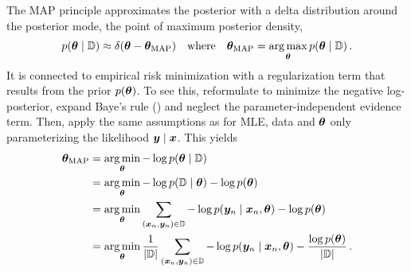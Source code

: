 The MAP principle approximates the posterior with a delta distribution around
the posterior mode, \ie the point of maximum posterior density,
\begin{align}
  \label{eq:background::MAP}
  p({\bm{\theta}}\;|\;{\mathbb{D}})
  \approx
  \delta({\bm{\theta}} - {\bm{\theta}}_{\text{MAP}})
  \quad\text{where}\quad
  {\bm{\theta}}_{\text{MAP}}
  =
  \operatorname*{arg\,max}_{{\bm{\theta}}} p({\bm{\theta}}\;|\;{\mathbb{D}})\,.
\end{align}
It is connected to empirical risk minimization with a regularization term that
results from the prior $p({\bm{\theta}})$. To see this, reformulate
 to minimize the negative log-posterior, expand Baye's
rule () and neglect the parameter-independent
evidence term. Then, apply the same assumptions as for MLE, \ie \iid data and
${\bm{\theta}}$ only parameterizing the likelihood ${\bm{y}}\;|\;{\bm{x}}$. This yields
\begin{align}
  \label{eq:background::MAPRelationToEmpiricalRiskMinimization}
  \begin{split}
    {\bm{\theta}}_{\text{MAP}}
    &= \operatorname*{arg\,min}_{{\bm{\theta}}} -\log p({\bm{\theta}}\;|\;{\mathbb{D}})
    \\
    &= \operatorname*{arg\,min}_{{\bm{\theta}}} -\log p({\mathbb{D}}\;|\;{\bm{\theta}}) - \log p({\bm{\theta}})
    \\
    &= \operatorname*{arg\,min}_{{\bm{\theta}}} \sum_{({\bm{x}}_n,{\bm{y}}_n) \in {\mathbb{D}}}
      -\log p({\bm{y}}_n\;|\;{\bm{x}}_n, {\bm{\theta}})
      -\log p({\bm{\theta}})
    \\
    &= \operatorname*{arg\,min}_{{\bm{\theta}}}
      \frac{1}{|{\mathbb{D}}|}
      \sum_{({\bm{x}}_n,{\bm{y}}_n) \in {\mathbb{D}}}
      -\log p({\bm{y}}_n\;|\;{\bm{x}}_n, {\bm{\theta}})
      -\frac{\log p({\bm{\theta}})}{|{\mathbb{D}}|}\,.
  \end{split}
\end{align}
